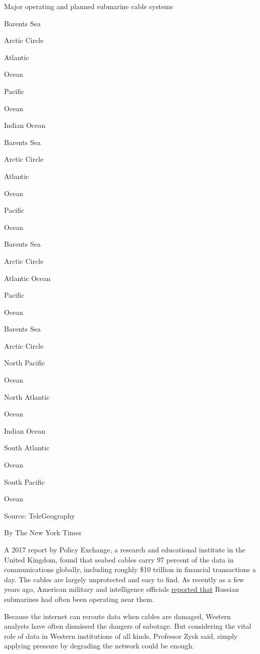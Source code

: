 Major operating and planned submarine cable systems

Barents Sea

Arctic Circle

Atlantic

Ocean

Pacific

Ocean

Indian Ocean

Barents Sea

Arctic Circle

Atlantic

Ocean

Pacific

Ocean

Barents Sea

Arctic Circle

Atlantic Ocean

Pacific

Ocean

Barents Sea

Arctic Circle

North Pacific

Ocean

North Atlantic

Ocean

Indian Ocean

South Atlantic

Ocean

South Pacific

Ocean

Source: TeleGeography

By The New York Times

A 2017 report by Policy Exchange, a research and educational institute
in the United Kingdom, found that seabed cables carry 97 percent of the
data in communications globally, including roughly \$10 trillion in
financial transactions a day. The cables are largely unprotected and
easy to find. As recently as a few years ago, American military and
intelligence officials
\href{https://www.nytimes.com/2015/10/26/world/europe/russian-presence-near-undersea-cables-concerns-us.html}{reported
that} Russian submarines had often been operating near them.

Because the internet can reroute data when cables are damaged, Western
analysts have often dismissed the dangers of sabotage. But considering
the vital role of data in Western institutions of all kinds, Professor
Zysk said, simply applying pressure by degrading the network could be
enough.

